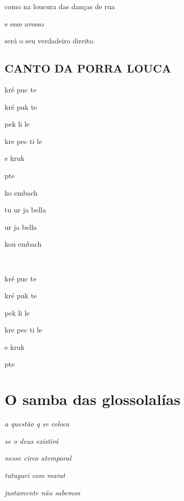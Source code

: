 como na loucura das danças de rua

e esse avesso

será o seu verdadeiro direito.



\pagebreak
\mbox{}\vspace*{\fill}
\section*{CANTO DA PORRA LOUCA}

\begin{center}
kré puc te

kré puk te

pek li le

kre pec ti le

e kruk

pte

ko embach

tu ur ja bella

ur ja bella

kou embach

~

kré puc te

kré puk te

pek li le

kre pec ti le

e kruk

pte

\end{center}
\mbox{}\vspace*{\fill}

\chapter{O samba das glossolalías}

\vspace*{-2\baselineskip}

\emph{a questão q se coloca}

\emph{se o deus existirá}

\emph{nesse circo atemporal}

\emph{tutuguri com marat}

\emph{justamente não sabemos}

